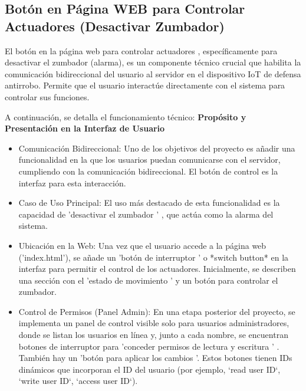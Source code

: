 \documentclass{report}
\begin{document}
\subsection{Botón en Página WEB para Controlar Actuadores (Desactivar Zumbador)}
El  botón en la página web para controlar actuadores , específicamente para  desactivar el zumbador  (alarma), es un componente técnico crucial que 
habilita la  comunicación bidireccional del usuario al servidor  en el dispositivo IoT de defensa antirrobo. Permite que el usuario interactúe directamente 
con el sistema para controlar sus funciones.

A continuación, se detalla el funcionamiento técnico:
\textbf{Propósito y Presentación en la Interfaz de Usuario}
\begin{itemize}
    \item Comunicación Bidireccional:  Uno de los objetivos del proyecto es añadir una funcionalidad en la que los usuarios puedan comunicarse con el 
    servidor, cumpliendo con la comunicación bidireccional. El botón de control es la interfaz para esta interacción.
    \item Caso de Uso Principal:  El uso más destacado de esta funcionalidad es la capacidad de   'desactivar el zumbador ' , que actúa como la alarma 
    del sistema.
    \item Ubicación en la Web:  Una vez que el usuario accede a la página web ('index.html'), se añade un  'botón de interruptor ' o *switch button* 
    en la interfaz para permitir el control de los actuadores. Inicialmente, se  describen una sección con el  'estado de movimiento ' y un botón 
    para controlar el zumbador.
    \item Control de Permisos (Panel Admin):  En una etapa posterior del proyecto, se implementa un panel de control visible solo para usuarios 
    administradores, donde se listan los usuarios en línea y, junto a cada nombre, se encuentran botones de interruptor para   'conceder permisos de 
    lectura y escritura ' . También hay un  'botón para aplicar los cambios '. Estos botones tienen IDs dinámicos que incorporan el ID del usuario 
    (por ejemplo, `read user ID`, `write user ID`, `access user ID`).
\end{itemize}
\end{document}
